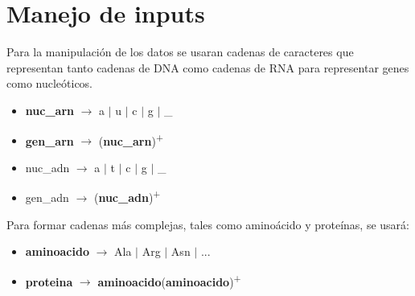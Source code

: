 \section{Manejo de inputs}
	\label{appendix-def}
\par Para la manipulación de los datos se usaran cadenas de caracteres que representan tanto cadenas de DNA como cadenas de RNA para representar genes como nucleóticos.
\begin{itemize}
	\item \textbf{nuc\_arn} $\to$  a $\vert$ u $\vert$ c $\vert$ g $\vert$ \_ 
	\item \textbf{gen\_arn} $\to$ (\textbf{nuc\_arn})\textsuperscript{+}

	\item {nuc\_adn} $\to$ a $\vert$ t $\vert$ c $\vert$ g $\vert$ \_
	\item {gen\_adn} $\to$ (\textbf{nuc\_adn})\textsuperscript{+}
\end{itemize}
\par Para formar cadenas más complejas, tales como aminoácido y proteínas, se usará:
\begin{itemize}
 	\item \textbf{aminoacido} $\to$ Ala $\vert$ Arg $\vert$ Asn $\vert$ ...	
	\item \textbf{proteina} $\to$ \textbf{aminoacido}(\textbf{aminoacido})\textsuperscript{+}
\end{itemize}
